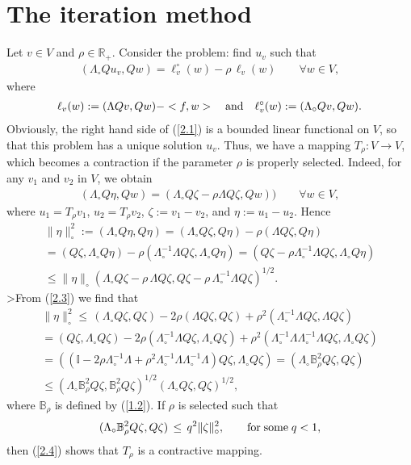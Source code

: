 \documentclass[amstex,amstext,amsfonts,epsf,12pt] {amsart}
\newcommand\be{\begin{eqnarray*}}
\newcommand\ee{\end{eqnarray*}}
\newcommand\ben{\begin{eqnarray}}
\newcommand\een{\end{eqnarray}}
\def\be{\begin{eqnarray*}}
\def\ee{\end{eqnarray*}}
\def\ben{\begin{eqnarray}}
\def\een{\end{eqnarray}}
\begin{document}


\section{The iteration method }
Let $v\in V$ and $\rho\in {\mathbb R}_+$.
Consider the problem: find $u_v$ such that
\ben
\label {2.1}
(\Lambda_\circ Q u_v, Q w)
=\ell^\circ_v(w) - \rho\, \ell_v(w)\qquad \forall w\in V,
\een
where
\be
\ell_v(w):=(\Lambda Qv, Qw)-
<f,w>\quad{\rm and}\quad \ell^\circ_v(w):= (\Lambda_\circ Q v, Q w).
\ee
Obviously, the right hand side of (\ref{2.1}) is a bounded linear
functional on $V$, so that this problem has a unique solution $u_v$. Thus,
we have a mapping $T_\rho:V\rightarrow V$, which becomes a contraction if the parameter  $\rho$ is properly selected.
Indeed, for  any $v_1$ and $v_2$ in $V$,
 we obtain
 \ben
 \label{2.2}
 (\Lambda_\circ Q\eta, Qw)
=(\Lambda_\circ Q\zeta-\rho \Lambda Q\zeta,Qw) )\qquad \forall w\in V,
\een
where $u_1 = T_\rho v_1$,  $u_2 = T_\rho v_2$, $\zeta:=v_1-v_2$, and $\eta:=u_1-u_2$.
Hence
\begin{multline}
\label {2.3}
\|\eta\|^2_\circ:=(\Lambda_\circ Q\eta, Q\eta)
=(\Lambda_\circ Q\zeta, Q \eta)-\rho (\Lambda Q\zeta, Q \eta)\\
=(Q\zeta, \Lambda_\circ Q\eta) -\rho (\Lambda^{-1}_\circ\Lambda Q\zeta, \Lambda_\circ Q\eta)
=(Q\zeta-\rho \Lambda^{-1}_\circ\Lambda Q\zeta, \Lambda_\circ Q\eta)\\
\leq
\|\eta\|_\circ
\left(\Lambda_\circ Q\zeta-\rho\,
\Lambda Q  \zeta, Q\zeta-\rho\,
\Lambda^{-1}_\circ\Lambda Q \zeta\right)^{1/2}.
\end{multline}
>From (\ref{2.3}) we find that
\begin{multline}
\label{2.4}
\|\eta\|^2_\circ\leq\,(\Lambda_\circ Q\zeta, Q\zeta)-2\rho (\Lambda Q\zeta, Q\zeta)+\rho^2
(\Lambda^{-1}_\circ \Lambda Q\zeta, \Lambda Q\zeta)\\
=(Q\zeta, \Lambda_\circ Q\zeta)-2\rho (\Lambda^{-1}_\circ\Lambda Q\zeta,\Lambda_\circ Q\zeta)+\rho^2
(\Lambda^{-1}_\circ\Lambda\Lambda^{-1}_\circ\Lambda Q\zeta, \Lambda_\circ Q\zeta)\\
=(({\mathbb I}-2\rho\Lambda^{-1}_\circ\Lambda+\rho^2\Lambda^{-1}_\circ\Lambda\Lambda^{-1}_\circ\Lambda)Q\zeta,\Lambda_\circ Q\zeta)=(\Lambda_\circ{\mathbb B}^2_\rho Q\zeta,Q\zeta)\\
\leq (\Lambda_\circ{\mathbb B}^2_\rho Q\zeta,{\mathbb B}^2_\rho Q\zeta)^{1/2}(\Lambda_\circ Q\zeta,Q\zeta)^{1/2},
\end{multline}
where ${\mathbb B}_\rho$ is defined by (\ref{1.2}). If   $\rho$ is selected such that
\ben
\label{2.5}
(\Lambda_\circ{\mathbb B}^2_\rho Q\zeta,Q\zeta)\,\leq\, q^2\|\zeta\|^2_\circ,
\qquad {\rm for\; some}\;q<1,
\een
then (\ref{2.4}) shows that $T_\rho$ is a contractive mapping.
\end{document}
